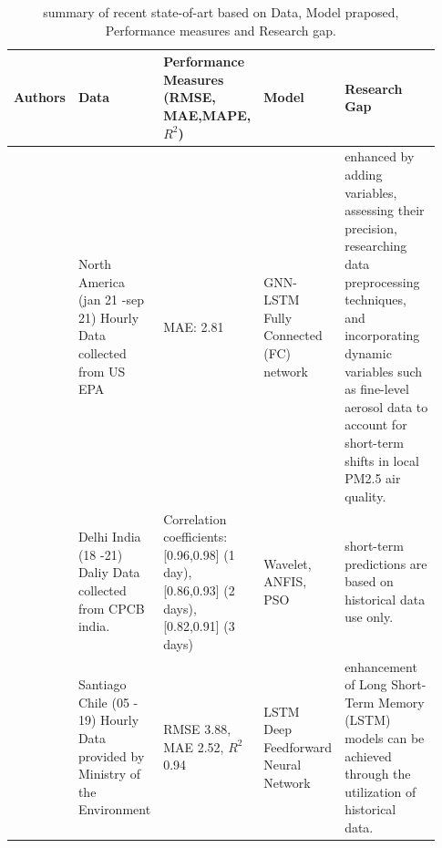 \documentclass[a4paper,fleqn]{cas-dc}
\begin{document}
\begin{landscape}
  \setlength{\tabcolsep}{3pt}
  
  {\renewcommand{\arraystretch}{1}%
  \begin{longtable}[h!]{ p{0.1\linewidth} p{0.2\linewidth} p{0.14\linewidth} p{0.11\linewidth} p{0.38\linewidth} }%
  \caption{summary of recent state-of-art based on Data, Model praposed, Performance measures and Research gap.}
  \label{t_lr}\\
  \hline
  Authors                    & Data                                                                                                     & Performance Measures (RMSE, MAE,MAPE, $R^2$)                                                                    & Model                                                               & Research Gap                                                       \\ \hline
  \endhead
  \hline
  \endfoot
  \endlastfoot
  \cite{li2023nested}                & North America (jan 21 -sep 21)   Hourly Data collected from US EPA                                       & MAE: 2.81                                                                                               & GNN-LSTM Fully Connected (FC) network                              & enhanced by adding variables, assessing their precision, researching data preprocessing techniques, and incorporating dynamic variables such as fine-level aerosol data to account for short-term shifts in local PM2.5 air quality.                                     \\
  \cite{pruthi2022low}           & Delhi  India (18 -21) Daliy Data collected from   CPCB india.                                            & Correlation coefficients: {[}0.96,0.98{]} (1   day), {[}0.86,0.93{]} (2 days), {[}0.82,0.91{]} (3 days) & Wavelet, ANFIS, PSO                                                 &  short-term predictions are based on historical data use only.                                                  \\
  \cite{menares2021forecasting}             & Santiago Chile (05 - 19) Hourly   Data provided by Ministry of the Environment                           & RMSE 3.88, MAE 2.52, $R^2$ 0.94                                                                            & LSTM Deep Feedforward Neural Network                               & enhancement of Long Short-Term Memory (LSTM) models can be achieved through the utilization of historical data.               \\

\end{longtable}}
\end{landscape}
\end{document}

